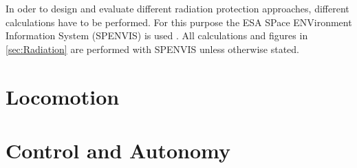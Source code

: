 In oder to design and evaluate different radiation protection approaches, different calculations have to be performed. For this purpose the ESA SPace ENVironment Information System (SPENVIS) is used \cite{Platzhalter}. All calculations and figures in \autoref{sec:Radiation} are performed with SPENVIS unless otherwise stated.

\section{Locomotion}
\label{sec:locomotion}

\section{Control and Autonomy}
\label{sec:ControlandAutonomy}

\cleardoublepage
